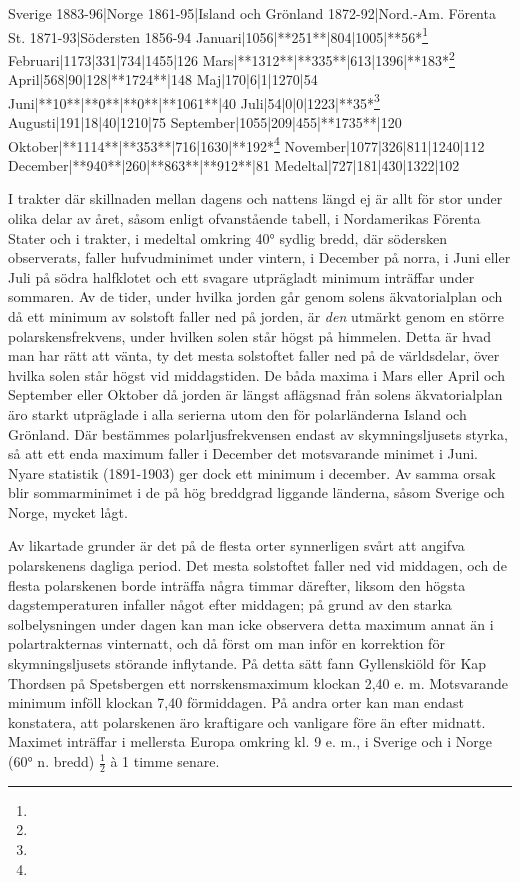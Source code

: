 \documentclass[a4paper, 12pt, oneside, swedish]{article}
\begin{document}
Sverige 1883-96|Norge 1861-95|Island och Grönland 1872-92|Nord.-Am. Förenta St. 1871-93|Södersten 1856-94  
Januari|1056|**251**|804|1005|**56*\footnote{}  
Februari|1173|331|734|1455|126  
Mars|**1312**|**335**|613|1396|**183*\footnote{}  
April|568|90|128|**1724**|148  
Maj|170|6|1|1270|54  
Juni|**10**|**0**|**0**|**1061**|40  
Juli|54|0|0|1223|**35*\footnote{}  
Augusti|191|18|40|1210|75  
September|1055|209|455|**1735**|120  
Oktober|**1114**|**353**|716|1630|**192*\footnote{}  
November|1077|326|811|1240|112  
December|**940**|260|**863**|**912**|81  
Medeltal|727|181|430|1322|102  

I trakter där skillnaden mellan dagens och nattens längd ej är allt för stor under olika delar av året, såsom enligt ofvanstående tabell, i Nordamerikas Förenta Stater och i trakter, i medeltal omkring 40° sydlig bredd, där södersken observerats, faller hufvudminimet under vintern, i December på norra, i Juni eller Juli på södra halfklotet och ett svagare utprägladt minimum inträffar under sommaren. Av de tider, under hvilka jorden går genom solens äkvatorialplan och då ett minimum av solstoft faller ned på jorden, är \emph{den} utmärkt genom en större polarskensfrekvens, under hvilken solen står högst på himmelen. Detta är hvad man har rätt att vänta, ty det mesta solstoftet faller ned på de världsdelar, över hvilka solen står högst vid middagstiden. De båda maxima i Mars eller April och September eller Oktober då jorden är längst aflägsnad från solens äkvatorialplan äro starkt utpräglade i alla serierna utom den för polarländerna Island och Grönland. Där bestämmes polarljusfrekvensen endast av skymningsljusets styrka, så att ett enda maximum faller i December det motsvarande minimet i Juni. Nyare statistik (1891-1903) ger dock ett minimum i december. Av samma orsak blir sommarminimet i de på hög breddgrad liggande länderna, såsom Sverige och Norge, mycket lågt.

Av likartade grunder är det på de flesta orter synnerligen svårt att angifva polarskenens dagliga period. Det mesta solstoftet faller ned vid middagen, och de flesta polarskenen borde inträffa några timmar därefter, liksom den högsta dagstemperaturen infaller något efter middagen; på grund av den starka solbelysningen under dagen kan man icke observera detta maximum annat än i polartrakternas vinternatt, och då först om man inför en korrektion för skymningsljusets störande inflytande. På detta sätt fann Gyllenskiöld för Kap Thordsen på Spetsbergen ett norrskensmaximum klockan 2,40 e. m. Motsvarande minimum inföll klockan 7,40 förmiddagen. På andra orter kan man endast konstatera, att polarskenen äro kraftigare och vanligare före än efter midnatt. Maximet inträffar i mellersta Europa omkring kl. 9 e. m., i Sverige och i Norge (60° n. bredd) $\frac{1}{2}$ à 1 timme senare.
\end{document}
